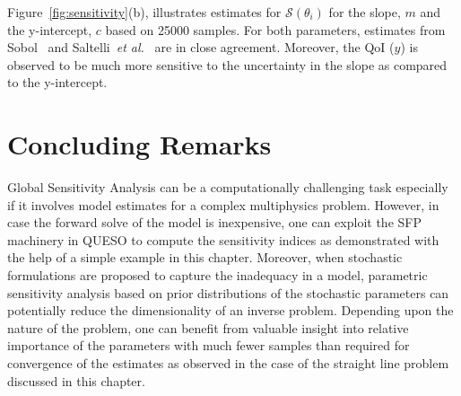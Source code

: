 Figure~\ref{fig:sensitivity}(b), illustrates estimates for $\mathcal{S}(\theta_{i})$ for the slope, $m$ and the
y-intercept, $c$ based on 25000 samples. For both parameters, estimates from Sobol~\cite{Sobol:1990} and 
Saltelli~\emph{et al.}~\cite{Saltelli:2010} are in close agreement. Moreover, the QoI ($y$) is observed
to be much more sensitive to the uncertainty in the slope as compared to the y-intercept. 

\section{Concluding Remarks}

Global Sensitivity Analysis can be a computationally challenging task especially  if it involves model
estimates for a complex multiphysics problem. However, in case the forward solve of the model is inexpensive, one
can exploit the SFP machinery in QUESO to compute the sensitivity indices as demonstrated with the
help of a simple example in this chapter. Moreover, when stochastic formulations are proposed to
capture the inadequacy in a model, parametric sensitivity analysis based on prior distributions of
the stochastic parameters can potentially reduce the dimensionality of an inverse problem.
Depending upon the nature of the problem, one can benefit from valuable insight into relative
importance of the parameters with much fewer samples than required for convergence of the estimates as
observed in the case of the straight line problem discussed in this chapter.  
 



















